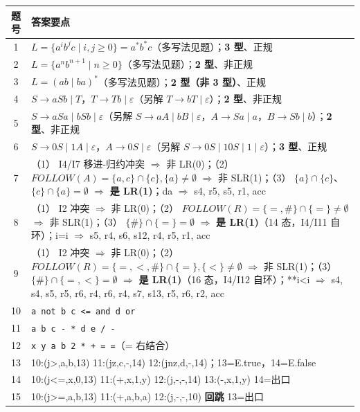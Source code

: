 \documentclass[12pt,a4paper,fontset=windows]{ctexart}
\begin{document}
\begin{center}
\renewcommand{\arraystretch}{1.3}
\setlength{\tabcolsep}{6pt}
\begin{tabular}{@{}c p{13.6cm}@{}}
\toprule
\textbf{题号} & \textbf{答案要点} \\
\midrule
1 & $L=\{a^i b^j c \mid i,j \ge 0\}=a^* b^* c$（多写法见题）；\textbf{3 型}、正规 \\
2 & $L=\{a^n b^{n+1} \mid n \ge 0\}$（多写法见题）；\textbf{2 型}、非正规 \\
3 & $L=(ab \mid ba)^*$（多写法见题）；\textbf{2 型（非 3 型）}、正规 \\
4 & $S \to aSb \mid T$，$T \to Tb \mid \varepsilon$（另解 $T \to bT \mid \varepsilon$）；\textbf{2 型}、非正规 \\
5 & $S \to aSa \mid bSb \mid \varepsilon$（另解 $S \to aA \mid bB \mid \varepsilon$，$A \to Sa \mid a$，$B \to Sb \mid b$）；\textbf{2 型}、非正规 \\
6 & $S \to 0S \mid 1A \mid \varepsilon$，$A \to 0S \mid \varepsilon$（另解 $S \to 0S \mid 10S \mid 1 \mid \varepsilon$）；\textbf{3 型}、正规 \\
7 & （1） I4/I7 移进-归约冲突 $\Rightarrow$ 非 LR(0)；（2） $FOLLOW(A)=\{a,c\} \cap \{c\},\{a\} \neq \emptyset$ $\Rightarrow$ 非 SLR(1)；（3） $\{a\} \cap \{c\}$、$\{c\} \cap \{a\} = \emptyset$ $\Rightarrow$ \textbf{是 LR(1)}；da $\Rightarrow$ s4, r5, s5, r1, acc \\
8 & （1） I2 冲突 $\Rightarrow$ 非 LR(0)；（2） $FOLLOW(R)=\{=,\#\} \cap \{=\} \neq \emptyset$ $\Rightarrow$ 非 SLR(1)；（3） $\{\#\} \cap \{=\} = \emptyset$ $\Rightarrow$ \textbf{是 LR(1)}（14 态，I4/I11 自环）；i=i $\Rightarrow$ s5, r4, s6, s12, r4, r5, r1, acc \\
9 & （1） I2 冲突 $\Rightarrow$ 非 LR(0)；（2） $FOLLOW(R)=\{=,<,\#\} \cap \{=\},\{<\} \neq \emptyset$ $\Rightarrow$ 非 SLR(1)；（3） $\{\#\} \cap \{=,<\} = \emptyset$ $\Rightarrow$ \textbf{是 LR(1)}（16 态，I4/I12 自环）；{*}{*}i<i $\Rightarrow$ s4, s4, s5, r5, r6, r4, r6, r4, s7, s13, r5, r6, r2, acc \\
10 & \texttt{a not b c <= and d or} \\
11 & \texttt{a b c - * d e / -} \\
12 & \texttt{x y a b 2 * + = =}（= 右结合） \\
13 & 10:(j>,a,b,13) 11:(jz,c,-,14) 12:(jnz,d,-,14)；13=E.true，14=E.false \\
14 & 10:(j<=,x,0,13) 11:(+,x,1,y) 12:(j,-,-,14) 13:(-,x,1,y) 14=出口 \\
15 & 10:(j>=,a,b,13) 11:(+,a,b,a) 12:(j,-,-,10) \textbf{回跳} 13=出口 \\
\bottomrule
\end{tabular}
\end{center}
\end{document}
